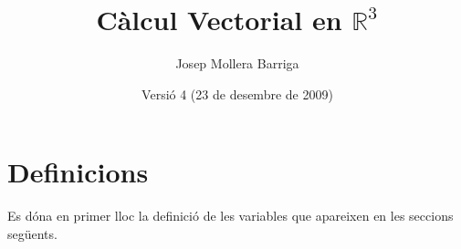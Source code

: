 \documentclass[catalan,a4paper,twoside,11pt]{article}
\begin{document}
\title{C\`{a}lcul Vectorial en $\mathbb{R}^3$}
\author{Josep Mollera Barriga}
\date{Versi\'{o} 4 (23 de desembre de 2009)}
\maketitle



\section{Definicions}

Es d\'{o}na  en primer lloc la definici\'{o} de les variables que
apareixen en les seccions seg\"{u}ents.
\end{document}
